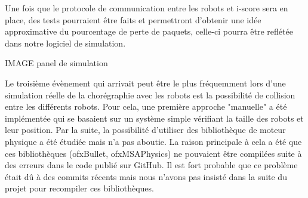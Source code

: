 Une fois que le protocole de communication entre les robots et i-score sera en place, des tests pourraient être faits et permettront d'obtenir une idée approximative du pourcentage de perte de paquets, celle-ci pourra être reflétée dans notre logiciel de simulation.

IMAGE panel de simulation

Le troisième évènement qui arrivait peut être le plus fréquemment lors d'une simulation réelle de la chorégraphie avec les robots est la possibilité de collision entre les différents robots. Pour cela, une première approche "manuelle" a été implémentée qui se basaient sur un système simple vérifiant la taille des robots et leur position. Par la suite, la possibilité d'utiliser des bibliothèque de moteur physique a été étudiée mais n'a pas aboutie. La raison principale à cela a été que ces bibliothèques (ofxBullet, ofxMSAPhysics) ne pouvaient être compilées suite à des erreurs dans le code publié sur GitHub. Il est fort probable que ce problème était dû à des commits récents mais nous n'avons pas insisté dans la suite du projet pour recompiler ces bibliothèques. 

